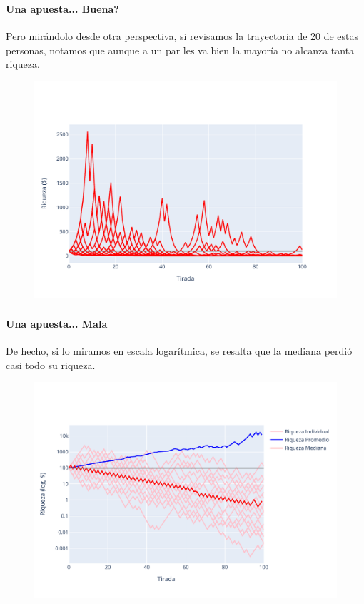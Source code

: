 \documentclass[../main.tex]{subfiles}
\begin{document}
\begin{frame}
  \frametitle{\SECTIONC}
  \framesubtitle{Una apuesta... Buena?}

  Pero mirándolo desde otra perspectiva, si revisamos la trayectoria de 20 de estas personas, notamos que aunque a un par les va bien la mayoría no alcanza tanta riqueza.

  \begin{figure}[H]
    \centering
    \includegraphics[scale=0.5]{img/paths.pdf}
  \end{figure}
\end{frame}

\begin{frame}
  \frametitle{\SECTIONC}
  \framesubtitle{Una apuesta... Mala}

  De hecho, si lo miramos en escala logarítmica, se resalta que la mediana perdió casi todo su riqueza.

  \begin{figure}[H]
    \centering
    \includegraphics[scale=0.5]{img/logPaths.pdf}
  \end{figure}
\end{frame}
\end{document}
